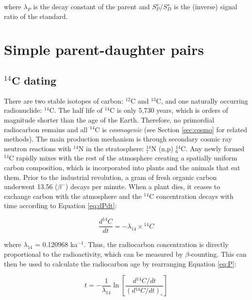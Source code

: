 \documentclass{book}
\begin{document}
where $\lambda_P$ is the decay constant of the parent and
$S^s_P/S^s_D$ is the (inverse) signal ratio of the standard.

\chapter{Simple parent-daughter pairs}

\section{$^{14}$C dating}
\label{sec:14C}

There are two stable isotopes of carbon: $^{12}$C and $^{13}$C, and
one naturally occurring radionuclide: $^{14}$C. The half life of
$^{14}$C is only 5,730 years, which is orders of magnitude shorter
than the age of the Earth. Therefore, no primordial radiocarbon
remains and all $^{14}$C is \emph{cosmogenic} (see Section
\ref{sec:cosmo} for related methods).  The main production mechanism
is through secondary cosmic ray neutron reactions with $^{14}$N in the
stratosphere: $^{14}_7$N (n,p) $^{14}_6$C. Any newly formed $^{14}$C
rapidly mixes with the rest of the atmosphere creating a spatially
uniform carbon composition, which is incorporated into plants and the
animals that eat them. Prior to the industrial revolution, a gram of
fresh organic carbon underwent 13.56 ($\beta^-$) decays per
minute. When a plant dies, it ceases to exchange carbon with the
atmosphere and the $^{14}$C concentration decays with time according
to Equation \ref{eq:dPdt}:

\begin{equation}
\frac{d^{14}C}{dt} = -\lambda_{14} \times {}^{14}C
\label{eq:d14Cdt}
\end{equation}

where $\lambda_{14}$ = 0.120968 ka$^{-1}$. Thus, the radiocarbon
concentration is directly proportional to the radioactivity, which can
be measured by $\beta$-counting. This can then be used to calculate
the radiocarbon age by rearranging Equation \ref{eq:P}:

\begin{equation}
t = -\frac{1}{\lambda_{14}}
\ln\left[\frac{d{}^{14}C/dt}{(d{}^{14}C/dt)_\circ}\right]
\label{eq:t14C}
\end{equation}
\end{document}
